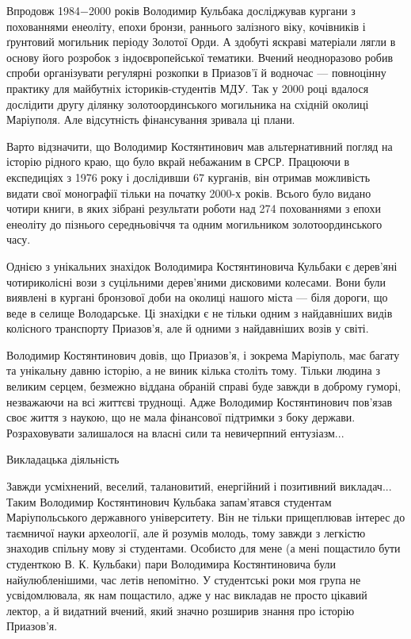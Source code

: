 Впродовж 1984−2000 років Володимир Кульбака досліджував кургани з похованнями
енеоліту, епохи бронзи, раннього залізного віку, кочівників і ґрунтовий
могильник періоду Золотої Орди. А здобуті яскраві матеріали лягли в основу його
розробок з індоєвропейської тематики. Вчений неодноразово робив спроби
організувати регулярні розкопки в Приазов'ї й водночас — повноцінну практику
для майбутніх істориків-студентів МДУ. Так у 2000 році вдалося дослідити другу
ділянку золотоординського могильника на східній околиці Маріуполя. Але
відсутність фінансування зривала ці плани.

Варто відзначити, що Володимир Костянтинович мав альтернативний погляд на
історію рідного краю, що було вкрай небажаним в СРСР. Працюючи в експедиціях з
1976 року і дослідивши 67 курганів, він отримав можливість видати свої
монографії тільки на початку 2000-х років. Всього було видано чотири книги, в
яких зібрані результати роботи над 274 похованнями з епохи енеоліту до пізнього
середньовіччя та одним могильником золотоординського часу.

Однією з унікальних знахідок Володимира Костянтиновича Кульбаки є дерев'яні
чотириколісні вози з суцільними дерев'яними дисковими колесами. Вони були
виявлені в кургані бронзової доби на околиці нашого міста — біля дороги, що
веде в селище Володарське. Ці знахідки є не тільки одним з найдавніших видів
колісного транспорту Приазов'я, але й одними з найдавніших возів у світі.

Володимир Костянтинович довів, що Приазов'я, і зокрема Маріуполь, має багату та
унікальну давню історію, а не виник кілька століть тому. Тільки людина з
великим серцем, безмежно віддана обраній справі буде завжди в доброму гуморі,
незважаючи на всі життєві труднощі. Адже Володимир Костянтинович пов'язав своє
життя з наукою, що не мала фінансової підтримки з боку держави. Розраховувати
залишалося на власні сили та невичерпний ентузіазм...

Викладацька діяльність 

Завжди усміхнений, веселий, талановитий, енергійний і позитивний викладач...
Таким Володимир Костянтинович Кульбака запам'ятався студентам Маріупольського
державного університету. Він не тільки прищеплював інтерес до таємничої науки
археології, але й розумів молодь, тому завжди з легкістю знаходив спільну мову
зі студентами. Особисто для мене (а мені пощастило бути студенткою В. К.
Кульбаки) пари Володимира Костянтиновича були найулюбленішими, час летів
непомітно. У студентські роки моя група не усвідомлювала, як нам пощастило,
адже у нас викладав не просто цікавий лектор, а й видатний вчений, який значно
розширив знання про історію Приазов'я.

